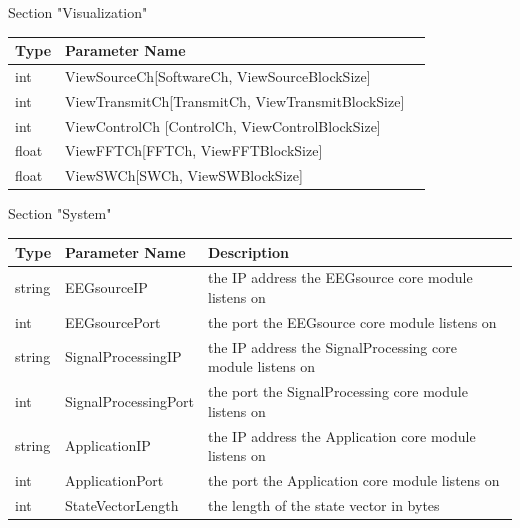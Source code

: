 \documentclass[letterpaper,oneside,12pt]{book}
\begin{document}
\begin{flushleft}
\vspace{.5cm}
\large Section "Visualization" \normalsize \\[1ex]

 \begin{tabular}{|l|l|l|}
  \hline
  \textbf{Type} & \textbf{Parameter Name}\\
  \hline
  int & ViewSourceCh[SoftwareCh, ViewSourceBlockSize]\\  
  \hline
  int & ViewTransmitCh[TransmitCh, ViewTransmitBlockSize]\\
  \hline
  int & ViewControlCh [ControlCh, ViewControlBlockSize] \\
  \hline
  float & ViewFFTCh[FFTCh, ViewFFTBlockSize] \\
  \hline
  float	& ViewSWCh[SWCh, ViewSWBlockSize] \\
  \hline
 \end{tabular}

\vspace{.5cm}
\large Section "System" \normalsize \\[1ex]

 \begin{tabular}{|l|l|l|}
  \hline
  \textbf{Type} & \textbf{Parameter Name} & \textbf{Description}\\
  \hline
  string & EEGsourceIP & the IP address the EEGsource core module listens on\\  
  \hline
  int & EEGsourcePort & the port the EEGsource core module listens on\\  
  \hline
  string & SignalProcessingIP & the IP address the SignalProcessing core module listens on\\  
  \hline
  int & SignalProcessingPort & the port the SignalProcessing core module listens on\\  
  \hline
  string & ApplicationIP & the IP address the Application core module listens on\\  
  \hline
  int & ApplicationPort & the port the Application core module listens on\\  
  \hline
  int & StateVectorLength & the length of the state vector in bytes\\  
  \hline
 \end{tabular}

\end{flushleft}
\end{document}
